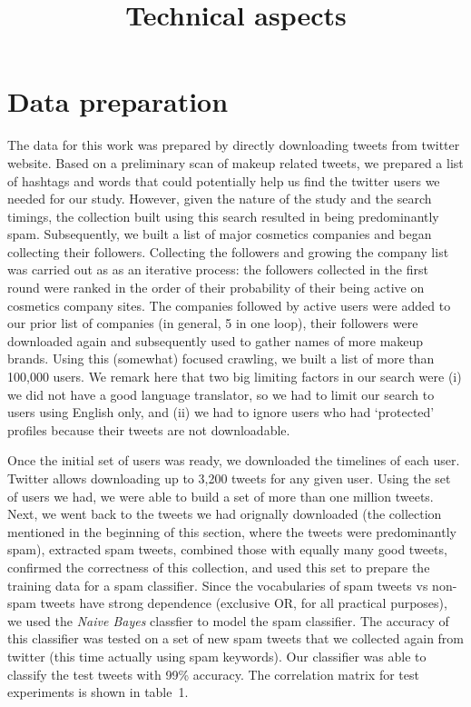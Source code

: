 \documentclass[11pt]{article}
\title{Technical aspects}
\date{}
\begin{document}
 
 \section{Data preparation}
The data for this work was prepared by directly downloading tweets from twitter website. Based on
a preliminary scan of makeup related tweets, we prepared a list of hashtags and words that could
potentially help us find the twitter users we needed for our study. However, given the nature of 
the study and the search timings, the collection built using this search resulted
in being predominantly spam. Subsequently, we built a list of major cosmetics companies and began collecting
their followers. Collecting the followers and growing the company list was carried out as
as an iterative process: the followers collected in the first round were ranked in the order
of their probability of their being active on cosmetics company sites. The companies
followed by active users were added to our prior list of companies (in general, 5 in one loop),
their followers were downloaded again and subsequently used to gather names of more makeup brands. 
Using this (somewhat) focused crawling, we built a list of 
more than 100,000 users. We remark here that two big limiting factors in our search were
(i) we did not have a good language translator, so we had to limit our search to users using English
only, and (ii) we had to ignore users who had `protected' profiles because their tweets are not
downloadable.

Once the initial set of users was ready, we downloaded the timelines of each user. Twitter allows downloading
up to 3,200 tweets for any given user. Using the set of users we had, we were able to build a set of
more than one million tweets. Next, we went back to the tweets we had orignally downloaded (the collection
mentioned in the beginning of this section, where the tweets were predominantly spam), extracted spam
tweets, combined those with equally many good tweets, confirmed the correctness of this collection, 
and used this set to prepare the training data for a spam classifier. Since the vocabularies of spam 
tweets vs non-spam tweets have strong dependence (exclusive OR, for all practical purposes), we used
the \textit{Naive Bayes} classfier to model the spam classifier. The accuracy of this classifier was 
tested on a set of new spam tweets that we collected again from twitter (this time actually using spam keywords).
Our classifier was able to classify the test tweets with 99\% accuracy. The correlation matrix 
for test experiments is shown in table~1. 
\end{document}
